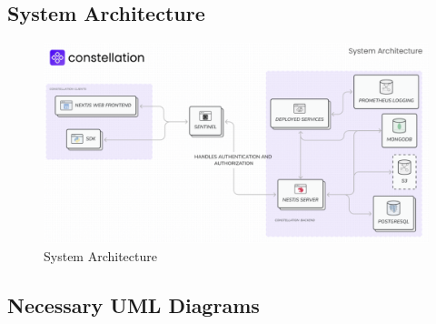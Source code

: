 \documentclass[12pt,a4paper]{report}     %
\begin{document}
\begin{normalsize}
{%
\newpage 
\chapter{}
{\setlength{\baselineskip}{1.1\baselineskip}

\section{System Architecture}
{\setlength{\baselineskip}{1.1\baselineskip}

\begin{figure}[H]
    \centering
    \includegraphics[scale=0.5]{diagrams/System_architecture.png}
        \caption{System Architecture}
    \label{}
\end{figure}
}
\section{Necessary UML Diagrams}
{\setlength{\baselineskip}{1.1\baselineskip}
}}}
\end{normalsize}
\end{document}
